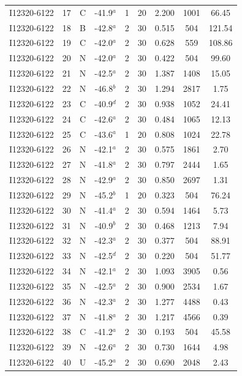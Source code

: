 \begin{table}
\begin{tabular}{ccccccccc}
I12320-6122 & 17 & C & -41.9$^{a}$ & 1 & 20 & 2.200 & 1001 & 66.45 \\
I12320-6122 & 18 & B & -42.8$^{a}$ & 2 & 30 & 0.515 & 504 & 121.54 \\
I12320-6122 & 19 & C & -42.0$^{a}$ & 2 & 30 & 0.628 & 559 & 108.86 \\
I12320-6122 & 20 & N & -42.0$^{a}$ & 2 & 30 & 0.422 & 504 & 99.60 \\
I12320-6122 & 21 & N & -42.5$^{a}$ & 2 & 30 & 1.387 & 1408 & 15.05 \\
I12320-6122 & 22 & N & -46.8$^{b}$ & 2 & 30 & 1.294 & 2817 & 1.75 \\
I12320-6122 & 23 & C & -40.9$^{d}$ & 2 & 30 & 0.938 & 1052 & 24.41 \\
I12320-6122 & 24 & C & -42.6$^{a}$ & 2 & 30 & 0.484 & 1065 & 12.13 \\
I12320-6122 & 25 & C & -43.6$^{a}$ & 1 & 20 & 0.808 & 1024 & 22.78 \\
I12320-6122 & 26 & N & -42.1$^{a}$ & 2 & 30 & 0.575 & 1861 & 2.70 \\
I12320-6122 & 27 & N & -41.8$^{a}$ & 2 & 30 & 0.797 & 2444 & 1.65 \\
I12320-6122 & 28 & N & -42.9$^{a}$ & 2 & 30 & 0.850 & 2697 & 1.31 \\
I12320-6122 & 29 & N & -45.2$^{b}$ & 1 & 20 & 0.323 & 504 & 76.24 \\
I12320-6122 & 30 & N & -41.4$^{a}$ & 2 & 30 & 0.594 & 1464 & 5.73 \\
I12320-6122 & 31 & N & -40.9$^{b}$ & 2 & 30 & 0.468 & 1213 & 7.94 \\
I12320-6122 & 32 & N & -42.3$^{a}$ & 2 & 30 & 0.377 & 504 & 88.91 \\
I12320-6122 & 33 & N & -42.5$^{d}$ & 2 & 30 & 0.220 & 504 & 51.77 \\
I12320-6122 & 34 & N & -42.1$^{a}$ & 2 & 30 & 1.093 & 3905 & 0.56 \\
I12320-6122 & 35 & N & -42.5$^{a}$ & 2 & 30 & 0.900 & 2534 & 1.67 \\
I12320-6122 & 36 & N & -42.3$^{a}$ & 2 & 30 & 1.277 & 4488 & 0.43 \\
I12320-6122 & 37 & N & -41.8$^{a}$ & 2 & 30 & 1.217 & 4566 & 0.39 \\
I12320-6122 & 38 & C & -41.2$^{a}$ & 2 & 30 & 0.193 & 504 & 45.58 \\
I12320-6122 & 39 & N & -42.6$^{a}$ & 2 & 30 & 0.730 & 1644 & 4.98 \\
I12320-6122 & 40 & U & -45.2$^{a}$ & 2 & 30 & 0.690 & 2048 & 2.43 \\

\end{tabular}
\end{table}

